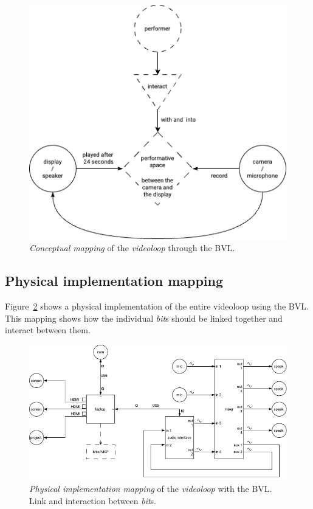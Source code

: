 \begin{figure}[!h]
    \centering
    \includegraphics[width=0.75\linewidth]{chapters/appendix/a/image/grapha-data-concept.png}
    \caption{\textit{Conceptual mapping} of the \textit{videoloop} through the BVL.}
    \label{fig:aa-mapping-conceptual}
\end{figure}

\subsection*{Physical implementation mapping}
Figure~\ref{fig:aa-mapping-physical} shows a physical implementation of the entire videoloop using the BVL. This mapping shows how the individual \textit{bit}s should be linked together and interact between them.

\begin{figure}[!h]
    \centering
    \includegraphics[width=\linewidth]{chapters/appendix/a/image/grapha-data-physical.png}
    \caption{\textit{Physical implementation mapping} of the \textit{videoloop} with the BVL. Link and interaction between \textit{bit}s.}
    \label{fig:aa-mapping-physical}
\end{figure}

